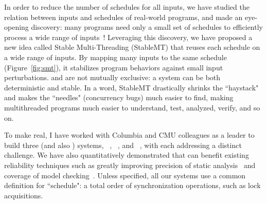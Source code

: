 In order to reduce the number of schedules for all inputs, we have studied the relation between inputs and schedules of real-world programs, and made an eye-opening discovery: many programs need only a small set of schedules to efficiently process a wide range of inputs~\cite{smt:cacm}! Leveraging this discovery, we have proposed a new idea called Stable Multi-Threading (StableMT) that reuses each schedule on a wide range of inputs. By mapping many inputs to the same schedule (Figure~\ref{fig:smt}), it stabilizes program behaviors against small input perturbations. \smt and \dmt are not mutually exclusive: a system can be both deterministic and stable. In a word, StableMT drastically shrinks the ``haystack" and makes the ``needles" (concurrency bugs) much easier to find, making multithreaded programs much easier to understand, test, analyzed, verify, and so on.


To make \smt real, I have worked with Columbia and CMU colleagues as a leader to build three \smt (and also \dmt) systems, \tern~\cite{cui:tern:osdi10}, \peregrine~\cite{peregrine:sosp11}, and \parrot~\cite{parrot:sosp13}, with each addressing a distinct challenge. We have also quantitatively demonstrated that \smt can benefit existing reliability techniques such as greatly improving precision of static analysis~\cite{wu:pldi12} and coverage of model checking~\cite{parrot:sosp13}. Unless specified, all our systems use a common definition for ``schedule": a total order of synchronization operations, such as lock acquisitions.

